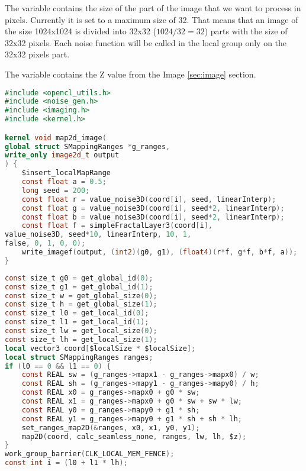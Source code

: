 The variable  contains the size of the part of the
image that we want to process in pixels. Currently it is set to a maximum size of 32.
That means that an image of the size 1024x1024 is divided into 32x32 ($1024/32=32$) parts
with the size of 32x32 pixels. Each noise function will be called in the local group
only on the 32x32 pixels part.

The variable  contains the Z value from the Image \ref{sec:image} section.

\begin{lstlisting}[caption={Kernel Example},label={lst:kernel_example},language=OpenCL]
#include <opencl_utils.h>
#include <noise_gen.h>
#include <imaging.h>
#include <kernel.h>

kernel void map2d_image(
global struct SMappingRanges *g_ranges,
write_only image2d_t output
) {
    $insert_localMapRange
    const float a = 0.5;
    long seed = 200;
    const float r = value_noise3D(coord[i], seed, linearInterp);
    const float g = value_noise3D(coord[i], seed*2, linearInterp);
    const float b = value_noise3D(coord[i], seed*2, linearInterp);
    const float f = simpleFractalLayer3(coord[i], 
value_noise3D, seed*10, linearInterp, 10, 1, 
false, 0, 1, 0, 0);
    write_imagef(output, (int2)(g0, g1), (float4)(r*f, g*f, b*f, a));
}
\end{lstlisting}

\begin{lstlisting}[caption={Local Map Range Code},label={lst:insert_local_map_range},language=OpenCL]
const size_t g0 = get_global_id(0);
const size_t g1 = get_global_id(1);
const size_t w = get_global_size(0);
const size_t h = get_global_size(1);
const size_t l0 = get_local_id(0);
const size_t l1 = get_local_id(1);
const size_t lw = get_local_size(0);
const size_t lh = get_local_size(1);
local vector3 coord[$localSize * $localSize];
local struct SMappingRanges ranges;
if (l0 == 0 && l1 == 0) {
    const REAL sw = (g_ranges->mapx1 - g_ranges->mapx0) / w;
    const REAL sh = (g_ranges->mapy1 - g_ranges->mapy0) / h;
    const REAL x0 = g_ranges->mapx0 + g0 * sw;
    const REAL x1 = g_ranges->mapx0 + g0 * sw + sw * lw;
    const REAL y0 = g_ranges->mapy0 + g1 * sh;
    const REAL y1 = g_ranges->mapy0 + g1 * sh + sh * lh;
    set_ranges_map2D(&ranges, x0, x1, y0, y1);
    map2D(coord, calc_seamless_none, ranges, lw, lh, $z);
}
work_group_barrier(CLK_LOCAL_MEM_FENCE);
const int i = (l0 + l1 * lh);
\end{lstlisting}
